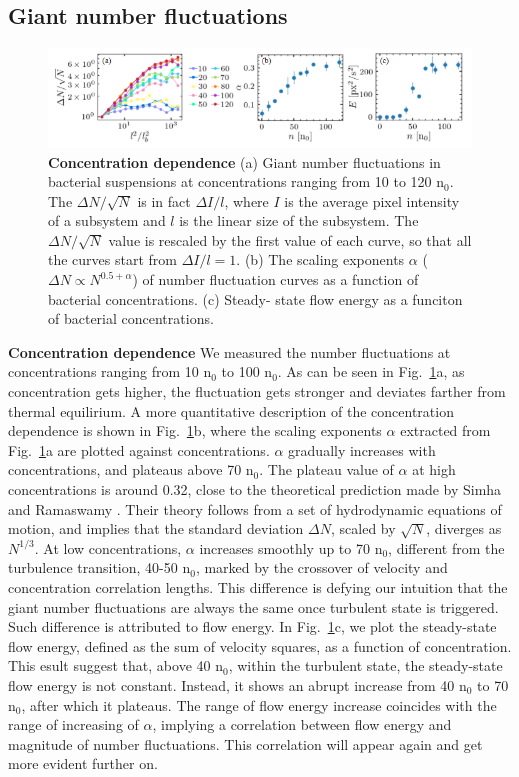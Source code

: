 \documentclass[twocolumn,aps,pre,amsmath,amssymb,longbibliography]{revtex4-1}
\begin{document}
\subsection{Giant number fluctuations}
\begin{figure}[!]
\begin{center}
\includegraphics[width=\textwidth]{GNF-figures-3-v3.png}
\caption[]{\textbf{Concentration dependence} (a) Giant number fluctuations in bacterial suspensions at concentrations ranging from 10 to 120 n$_0$. The $\Delta N/\sqrt{N}$ is in fact $\Delta I/l$, where $I$ is the average pixel intensity of a subsystem and $l$ is the linear size of the subsystem. The $\Delta N/\sqrt{N}$ value is rescaled by the first value of each curve, so that all the curves start from $\Delta I/l=1$. (b) The scaling exponents $\alpha$ ($\Delta N \propto N^{0.5+\alpha}$) of number fluctuation curves as a function of bacterial concentrations. (c) Steady- state flow energy as a funciton of bacterial concentrations.}
\label{fig:3}
\end{center}
\end{figure}
\textbf{Concentration dependence} We measured the number fluctuations at concentrations ranging from 10 n$_0$ to 100 n$_0$. As can be seen in Fig.~\ref{fig:3}a, as concentration gets higher, the fluctuation gets stronger and deviates farther from thermal equilirium. A more quantitative description of the concentration dependence is shown in Fig.~\ref{fig:3}b, where the scaling exponents $\alpha$ extracted from Fig.~\ref{fig:3}a are plotted against concentrations. $\alpha$ gradually increases with concentrations, and plateaus above 70 n$_0$. The plateau value of $\alpha$ at high concentrations is around 0.32, close to the theoretical prediction made by Simha and Ramaswamy \cite{PhysRevLett.89.058101}. Their theory follows from a set of hydrodynamic equations of motion, and implies that the standard deviation $\Delta N$, scaled by
$\sqrt N$, diverges as $N^{1/3}$. At low concentrations, $\alpha$ increases smoothly up to 70 n$_0$, different from the turbulence transition, 40-50 n$_0$, marked by the crossover of velocity and concentration correlation lengths. This difference is defying our intuition that the giant number fluctuations are always the same once turbulent state is triggered. Such difference is attributed to flow energy. In Fig.~\ref{fig:3}c, we plot the steady-state flow energy, defined as the sum of velocity squares, as a function of concentration. This esult suggest that, above 40 n$_0$, within the turbulent state, the steady-state flow energy is not constant. Instead, it shows an abrupt increase from 40 n$_0$ to 70 n$_0$, after which it plateaus. The range of flow energy increase coincides with the range of increasing of $\alpha$, implying a correlation between flow energy and magnitude of number fluctuations. This correlation will appear again and get more evident further on.
\end{document}
